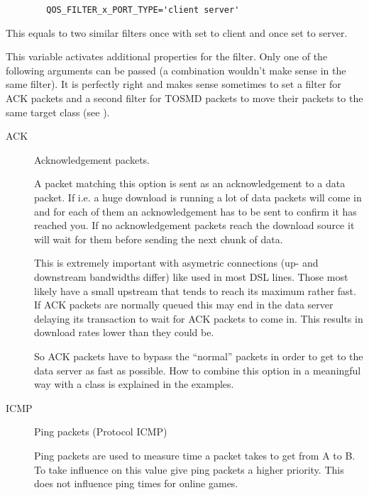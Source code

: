 \begin{description}
\begin{example}
\begin{verbatim}
        QOS_FILTER_x_PORT_TYPE='client server'
\end{verbatim}
\end{example}

   This equals to two similar filters once with 
   set to client and once set to server.



   This variable activates additional properties for the filter. Only one of
   the following arguments can be passed (a combination wouldn't make sense
   in the same filter). It is perfectly right and makes sense sometimes to
   set a filter for ACK packets and a second filter for TOSMD packets to
   move their packets to the same target class (see ).

   \begin{description}
   \item[ACK] Acknowledgement packets.

   A packet matching this option is sent as an acknowledgement to
   a data packet. If i.e. a huge download is running a lot of data packets
   will come in and for each of them an acknowledgement has to be sent to
   confirm it has reached you. If no acknowledgement packets reach the
   download source it will wait for them before sending the next chunk
   of data.

   This is extremely important with asymetric connections (up- and downstream
   bandwidths differ) like used in most DSL lines. Those most likely have a
   small upstream that tends to reach its maximum rather fast. If ACK
   packets are normally queued this may end in the data server delaying
   its transaction to wait for ACK packets to come in. This results in
   download rates lower than they could be.

   So ACK packets have to bypass the ``normal'' packets in order
   to get to the data server as fast as possible. How to combine
   this option in a meaningful way with a class is explained in
   the examples.

 \item[ICMP] Ping packets (Protocol ICMP)

   Ping packets are used to measure time a packet takes to get from A to B.
   To take influence on this value give ping packets a higher priority.
   This does not influence ping times for online games.


\end{description}
\end{description}
